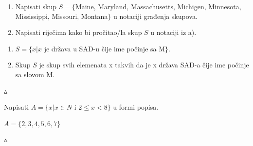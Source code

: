\documentclass[a4paper,14pt,svgnames]{article}
\newcounter{counter}
\newcommand{\examplecounter}{\textbf{\refstepcounter{counter}PRIMJER \thecounter}}
\newcommand{\example}[3]{\begin{tcolorbox}[title=\large \examplecounter \hfill\small\textbf{"#1"}]
#2
\begin{tcolorbox}[title=\small \textbf{RJEŠENJE},colback=white]
\begin{center}
#3

\vspace{0.5em}\hfill $\vartriangle$
\end{center}
\end{tcolorbox}
\end{tcolorbox}}
\begin{document}
\example{Forma popisa u notaciji građenja skupova}{\begin{enumerate}[label=\alph*),leftmargin=0.5cm]
\item Napisati skup $S = \{$Maine, Maryland, Massachusetts, Michigen, Minnesota, Mississippi, Missouri, Montana$\}$ u notaciji građenja skupova.
\item Napisati riječima kako bi pročitao/la skup $S$ u notaciji iz a).
\end{enumerate}}{\begin{enumerate}[label=\alph*),leftmargin=0.5cm]
\item $S=\{x|x$ je država u SAD-u čije ime počinje sa M$\}$.
\item Skup $S$ je skup svih elemenata x takvih da je x država SAD-a čije ime počinje sa slovom M.
\end{enumerate}}

\example{Notacija građenja skupova u formi popisa}{Napisati $A=\{x|x\in N$ i $2\leqslant x<8\}$ u formi popisa.}{$A=\{2, 3, 4, 5, 6, 7\}$}
\end{document}
